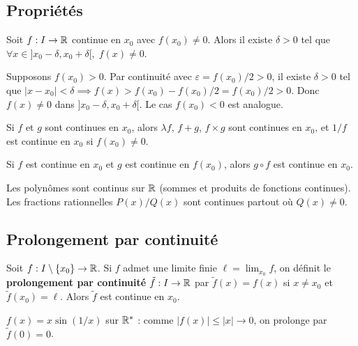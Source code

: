 \subsection{Propriétés}

\begin{lemme}
Soit $f : I \to \mathbb{R}$ continue en $x_0$ avec $f(x_0) \neq 0$. Alors il existe $\delta > 0$ tel que $\forall x \in ]x_0 - \delta, x_0 + \delta[, \; f(x) \neq 0$.
\end{lemme}

\begin{proofbox}
Supposons $f(x_0) > 0$. Par continuité avec $\varepsilon = f(x_0)/2 > 0$, il existe $\delta > 0$ tel que $|x - x_0| < \delta \implies f(x) > f(x_0) - f(x_0)/2 = f(x_0)/2 > 0$. Donc $f(x) \neq 0$ dans $]x_0 - \delta, x_0 + \delta[$. Le cas $f(x_0) < 0$ est analogue.
\end{proofbox}

\begin{propbox}
Si $f$ et $g$ sont continues en $x_0$, alors $\lambda f$, $f + g$, $f \times g$ sont continues en $x_0$, et $1/f$ est continue en $x_0$ si $f(x_0) \neq 0$.
\end{propbox}

\begin{propbox}
Si $f$ est continue en $x_0$ et $g$ est continue en $f(x_0)$, alors $g \circ f$ est continue en $x_0$.
\end{propbox}

\begin{exbox}[Conséquences]
Les polynômes sont continus sur $\mathbb{R}$ (sommes et produits de fonctions continues). Les fractions rationnelles $P(x)/Q(x)$ sont continues partout où $Q(x) \neq 0$.
\end{exbox}

\subsection{Prolongement par continuité}

\begin{defbox}
Soit $f : I \setminus \{x_0\} \to \mathbb{R}$. Si $f$ admet une limite finie $\ell = \lim_{x_0} f$, on définit le \textbf{prolongement par continuité} $\tilde{f} : I \to \mathbb{R}$ par $\tilde{f}(x) = f(x)$ si $x \neq x_0$ et $\tilde{f}(x_0) = \ell$. Alors $\tilde{f}$ est continue en $x_0$.
\end{defbox}

\begin{exbox}
$f(x) = x \sin(1/x)$ sur $\mathbb{R}^*$ : comme $|f(x)| \leqslant |x| \to 0$, on prolonge par $\tilde{f}(0) = 0$.
\end{exbox}

